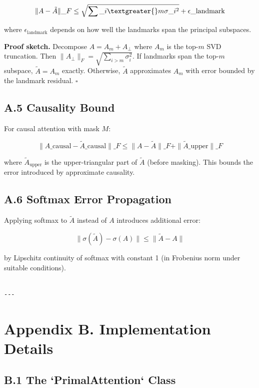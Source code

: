 \[
\|A - \tilde{A}\|\_F \leq \sqrt{\sum\_{i \textgreater{} m} \sigma\_i^2} + \epsilon\_\text{landmark}
\]

where $\epsilon_\text{landmark}$ depends on how well the landmarks span the 
principal subspaces.

\textbf{Proof sketch.} Decompose $A = A_m + A_\perp$ where $A_m$ is the top-$m$ 
SVD truncation. Then $\|A_\perp\|_F = \sqrt{\sum_{i>m} \sigma_i^2}$. If 
landmarks span the top-$m$ subspace, $\tilde{A} = A_m$ exactly. Otherwise, 
$\tilde{A}$ approximates $A_m$ with error bounded by the landmark residual. 
$\square$

\subsection{A.5 Causality Bound}

For causal attention with mask $M$:

\[
\|A\_\text{causal} - \tilde{A}\_\text{causal}\|\_F \leq \|A - \tilde{A}\|\_F + \|\tilde{A}\_\text{upper}\|\_F
\]

where $\tilde{A}_\text{upper}$ is the upper-triangular part of $\tilde{A}$ 
(before masking). This bounds the error introduced by approximate causality.

\subsection{A.6 Softmax Error Propagation}

Applying softmax to $\tilde{A}$ instead of $A$ introduces additional error:

\[
\|\sigma(\tilde{A}) - \sigma(A)\| \le \|\tilde{A} - A\|
\]

by Lipschitz continuity of softmax with constant 1 (in Frobenius norm under 
suitable conditions).
\begin{lstlisting}

---
\end{lstlisting}


\section{Appendix B. Implementation Details}

\subsection{B.1 The `PrimalAttention` Class}

